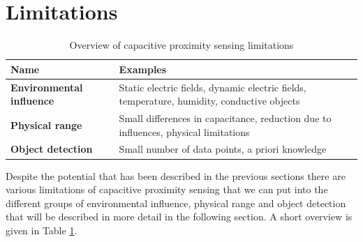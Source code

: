 \section{Limitations}
\begin{table}[htbp]
  \centering
  \caption{Overview of capacitive proximity sensing limitations}
    \begin{tabular}{p{4cm}p{6cm}}
    \toprule
    \textbf{Name} & \textbf{Examples} \\
    \midrule
    \textbf{Environmental influence} & Static electric fields, dynamic electric fields, temperature, humidity, conductive objects \\
    \textbf{Physical range} & Small differences in capacitance, reduction due to influences, physical limitations \\
    \textbf{Object detection} & Small number of data points, a priori knowledge \\
    \bottomrule
    \end{tabular}%
  \label{tab:cap_limitations}%
\end{table}%

Despite the potential that has been described in the previous sections there are various limitations of capacitive proximity sensing that we can put into the different groups of environmental influence, physical range and object detection that will be described in more detail in the following section. A short overview is given in Table \ref{tab:cap_limitations}.
